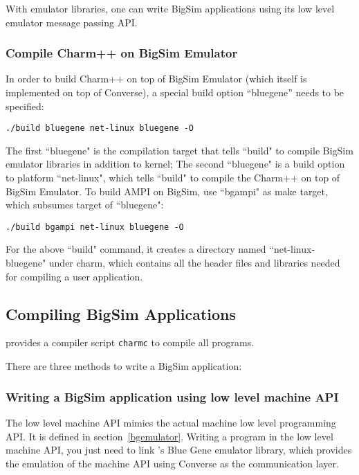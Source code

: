 With emulator libraries, one can write BigSim applications using its
low level emulator message passing API.

\subsubsection{Compile Charm++ on BigSim Emulator}

In order to build Charm++ on top of BigSim Emulator (which itself is 
implemented on top of Converse), a special build option ``bluegene''
needs to be specified:
\begin{verbatim}
./build bluegene net-linux bluegene -O
\end{verbatim}

The first ``bluegene" is the compilation target that tells ``build" to
compile BigSim emulator libraries in addition to \charmpp{} kernel;
The second ``bluegene" is a build option to platform ``net-linux", which tells
``build" to compile the Charm++ on top of BigSim Emulator. 
To build AMPI on BigSim, use ``bgampi" as make target, which subsumes target
of ``bluegene":
\begin{verbatim}
./build bgampi net-linux bluegene -O
\end{verbatim}

For the above ``build" command, it creates a directory named 
``net-linux-bluegene" under charm, which contains all the header files and
libraries needed for compiling a user application.

\subsection{Compiling BigSim Applications}

\charmpp{} provides a compiler script {\tt charmc} to compile all programs.

There are three methods to write a BigSim application:

\subsubsection{Writing a BigSim application using low level machine API}
The low level machine API mimics the actual machine low level programming
API. It is defined in section~\ref{bgemulator}. Writing a program in the 
low level machine API, you just need to link \charmpp{}'s Blue Gene emulator
library, which provides the emulation of the machine API using Converse as
the communication layer.

